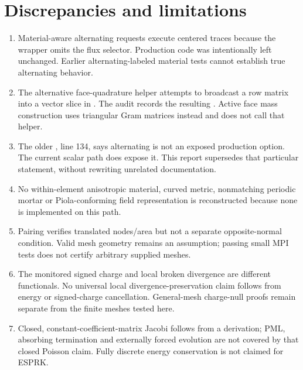 \documentclass[11pt,a4paper]{article}
\begin{document}
\section{Discrepancies and limitations}\label{sec:limitations}
\begin{enumerate}
\item Material-aware alternating requests execute centered traces because
the wrapper omits the flux selector. Production code was intentionally left
unchanged. Earlier alternating-labeled material tests cannot establish true
alternating behavior.
\item The alternative face-quadrature helper attempts to broadcast a row
matrix into a vector slice in . The audit
records the resulting . Active face mass construction
uses triangular Gram matrices instead and does not call that helper.
\item The older ,
line 134, says alternating is not an exposed production option. The current
scalar path does expose it. This report supersedes that particular statement,
without rewriting unrelated documentation.
\item No within-element anisotropic material, curved metric, nonmatching
periodic mortar or Piola-conforming field representation is reconstructed
because none is implemented on this path.
\item Pairing verifies translated nodes/area but not a separate opposite-normal
condition. Valid mesh geometry remains an assumption; passing small MPI tests
does not certify arbitrary supplied meshes.
\item The monitored signed charge and local broken divergence are different
functionals. No universal local divergence-preservation claim follows from
energy or signed-charge cancellation. General-mesh charge-null proofs remain
separate from the finite meshes tested here.
\item Closed, constant-coefficient-matrix Jacobi follows from a derivation;
PML, absorbing termination and externally forced evolution are not covered
by that closed Poisson claim. Fully discrete energy conservation is not
claimed for ESPRK.
\end{enumerate}

\appendix
\end{document}
